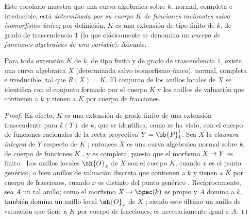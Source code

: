 \documentclass[oneside,10pt]{amsart}
\makeatletter
\newcommand{\ega@arrow}[2]{\mathchoice{#1}{#2}{#2}{#2}}
\renewcommand{\to}{\ega@arrow{\longrightarrow}{\rightarrow}}
\let\EGAOriginalLabel\label
\renewcommand{\label}[1]{\phantomsection\EGAOriginalLabel{#1}}
\makeatother
\begin{document}
\begin{env}[7.4.17]
\label{II.7.4.17}
Este corolario  muestra que una curva algebraica sobre $k$, normal, completa e irreducible, está \emph{determinada por su cuerpo $K$ de funciones racionales salvo isomorfismo único};
por definición, $K$ es una extensión de tipo finito de $k$, de grado de trascendencia $1$ (lo que clásicamente se denomina un \emph{cuerpo de funciones algebraicas de una variable}).
Además:
\end{env}

\begin{proposition}[7.4.18]
\label{II.7.4.18}
Para toda extensión $K$ de $k$, de tipo finito y de grado de trascendencia $1$, existe una curva algebraica $X$ (determinada salvo isomorfismo único), normal, completa e irreducible, tal que $R(X)=K$.
El conjunto de los anillos locales de $X$ se identifica  con el conjunto formado por el cuerpo $K$ y los anillos de valuación que contienen a $k$ y tienen a $K$ por cuerpo de fracciones.
\end{proposition}

\begin{proof}
En efecto, $K$ es una extensión de grado finito de una extensión trascendente pura $k(T)$ de $k$, que se identifica, como se ha visto, con el cuerpo de funciones racionales de la recta proyectiva $Y=\bb{P}_k^1$.
Sea $X$ la \emph{clausura integral} de $Y$ respecto de $K$ ;
entonces $X$ es una curva algebraica normal sobre $k$, de cuerpo de funciones $K$ , y es completa, puesto que el morfismo $X\to Y$ es finito .
Los anillos locales $\sh{O}_x$ de $X$ son el cuerpo $K$, cuando $x$ es el punto genérico, o bien anillos de valuación discreta que contienen a $k$ y tienen a $K$ por cuerpo de fracciones, cuando $x$ es distinto del punto genérico .
Recíprocamente, sea $A$ un tal anillo;
como el morfismo $X\to\Spec(k)$ es propio y $A$ domina a $k$, también domina un anillo local $\sh{O}_x$ de $X$ ;
siendo este último un anillo de valuación que tiene a $K$ por cuerpo de fracciones, es necesariamente igual a $A$.
\end{proof}
\end{document}
